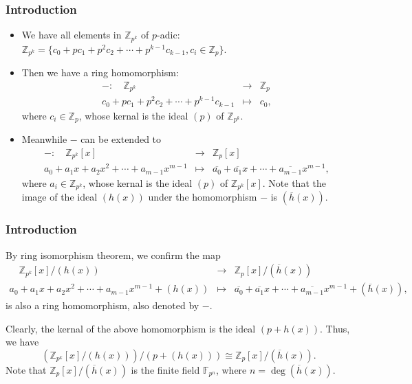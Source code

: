 \documentclass[
    aspectratio=169,                   %
]{beamer}
\newcommand{\Z}{\mathbb{Z}}
\newcommand{\F}{\mathbb{F}}
\begin{document}
    \begin{frame}
        \frametitle{Introduction}
        \begin{itemize}
             
            \item We have all elements in $ \Z_{p^k} $ of $ p $-adic: 
        $ \Z_{p^k}=\{c_0+pc_1+p^2c_2+\cdots+p^{k-1}c_{k-1},c_i\in\Z_p\}.$
        \item Then we have a ring homomorphism:
        \[\begin{array}{ccc}
            -:\quad\Z_{p^k}&\rightarrow &\Z_{p}\\
            c_0+pc_1+p^2c_2+\cdots+p^{k-1}c_{k-1}&\mapsto &c_0,
        \end{array}\]
        where $ c_i\in\Z_{p} $, whose kernal is the ideal $ (p) $ of $ \Z_{p^k} $.
        
        \item Meanwhile $ - $ can be extended to 
        \[\begin{array}{ccc}
            -:\quad\Z_{p^k}[x]&\rightarrow&\Z_{p}[x]\\
            a_0+a_1x+a_2x^2+\cdots+a_{m-1}x^{m-1}&\mapsto&\overline{a_0}+\overline{a_1}x+\cdots+\overline{a_{m-1}}x^{m-1},
        \end{array}\]
        where $ a_i\in\Z_{p^k} $, whose kernal is the ideal $ (p) $ of $ \Z_{p^k}[x] $. 
        Note that the image of the ideal $ (h(x)) $ under the homomorphism $ - $ is $ (\overline{h}(x)) $.
    \end{itemize}
    \end{frame}

    \begin{frame}
        \frametitle{Introduction}
    
        By ring isomorphism theorem, we confirm the map
        \[\begin{array}{ccc}
            \quad\Z_{p^k}[x]/(h(x))&\rightarrow&\Z_{p}[x]/(\overline{h}(x))\\
            a_0+a_1x+a_2x^2+\cdots+a_{m-1}x^{m-1}+(h(x))&\mapsto&\overline{a_0}+\overline{a_1}x+\cdots+\overline{a_{m-1}}x^{m-1}+(\overline{h}(x)) ,
        \end{array}\]
    is also a ring homomorphism, also denoted by $ - $.

    Clearly, the kernal of the above homomorphism is the ideal $ (p+h(x)) $. Thus, we have 
    \[(\Z_{p^k}[x]/(h(x)))/(p+(h(x)))\cong\Z_p[x]/(\overline{h}(x)).\]
    Note that $ \Z_p[x]/(\overline{h}(x)) $ is the finite field $ \F_{p^n} $, where $ n=\deg(\overline{h}(x)) $.
    \end{frame}
\end{document}
